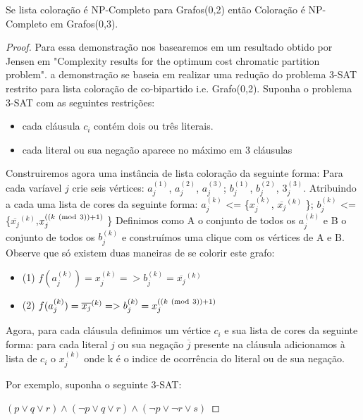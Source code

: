     \begin{corolario}
    Se lista coloração é NP-Completo para Grafos(0,2) então Coloração é NP-Completo em Grafos(0,3).
    \begin{proof}
    Para essa demonstração nos basearemos em um resultado obtido por Jensen em "Complexity results for the optimum cost chromatic partition problem". a demonstração se baseia em realizar uma redução do problema 3-SAT restrito para lista coloração de co-bipartido i.e. Grafo(0,2).
    Suponha o problema 3-SAT com as seguintes restrições:
    \begin{itemize}
      \item cada cláusula $c_i$ contém dois ou três literais.
      \item cada literal ou sua negação aparece no máximo em 3 cláusulas
    \end{itemize}
    Construiremos agora uma instância de lista coloração da seguinte forma:\newline
    Para cada varíavel $j$ crie seis vértices:
    $a_j^{(1)}$, $a_j^{(2)}$, $a_j^{(3)}$;
    $b_j^{(1)}$, $b_j^{(2)}$, $3_j^{(3)}$. Atribuindo a cada uma lista de cores da seguinte forma:\newline
    $a_j^{(k)}$ <= \{$x_j^{(k)}$, $\overline{x_j}^{(k)}$ \}; $b_j^{(k)}$ <= \{$\overline{x_j}^{(k)}$,$x_j^{((k \ (\mathrm{mod}\ 3)) + 1 )}$ \}\newline
    Definimos como A o conjunto de todos os $a_j^{(k)}$ e B o conjunto de todos os $b_j^{(k)}$ e construímos uma clique com os vértices de A e B. Observe que só existem duas maneiras de se colorir este grafo:
    \begin{itemize}
      \item (1)  $f(a_j^{(k)}) = x_j^{(k)} => b_j^{(k)} = \overline{x_j}^{(k)}$
      \item (2)  $f(a_j^{(k)}) = \overline{x_j}^{(k)} => b_j^{(k)} = x_j^{((k \ (\mathrm{mod}\ 3)) + 1 )}$
    \end{itemize}
    Agora, para cada cláusula definimos um vértice $c_i$ e sua lista de cores da seguinte forma: para cada literal $j$ ou sua negação $\overline{j}$ presente na cláusula adicionamos à lista de $c_i$ o $x_j^{(k)}$ onde k é o indice de ocorrência do literal ou de sua negação.
    
    Por exemplo, suponha o seguinte 3-SAT:
    
    $(p \lor q \lor r) \land (\neg{p} \lor q \lor r) \land (\neg{p} \lor \neg{r} \lor s)$
    

\end{proof}
\end{corolario}
